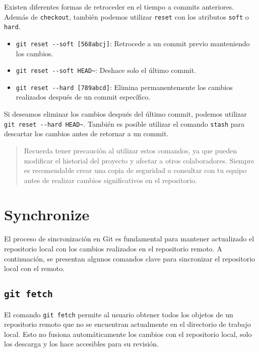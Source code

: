 \documentclass[
  a4paper,
]{article}
\providecommand{\tightlist}{%
  \setlength{\itemsep}{0pt}\setlength{\parskip}{0pt}}\usepackage{longtable,booktabs,array}
\begin{document}
Existen diferentes formas de retroceder en el tiempo a commits
anteriores. Además de \texttt{checkout}, también podemos utilizar
\texttt{reset} con los atributos \texttt{soft} o \texttt{hard}.

\begin{itemize}
\tightlist
\item
  \texttt{git\ reset\ -\/-soft\ {[}568abcj{]}}: Retrocede a un commit
  previo manteniendo los cambios.
\item
  \texttt{git\ reset\ -\/-soft\ HEAD\textasciitilde{}}: Deshace solo el
  último commit.
\item
  \texttt{git\ reset\ -\/-hard\ {[}789abcd{]}}: Elimina permanentemente
  los cambios realizados después de un commit específico.
\end{itemize}

Si deseamos eliminar los cambios después del último commit, podemos
utilizar \texttt{git\ reset\ -\/-hard\ HEAD\textasciitilde{}}. También
es posible utilizar el comando \texttt{stash} para descartar los cambios
antes de retornar a un commit.

\begin{quote}
Recuerda tener precaución al utilizar estos comandos, ya que pueden
modificar el historial del proyecto y afectar a otros colaboradores.
Siempre es recomendable crear una copia de seguridad o consultar con tu
equipo antes de realizar cambios significativos en el repositorio.
\end{quote}

\section{Synchronize}\label{synchronize}

El proceso de sincronización en Git es fundamental para mantener
actualizado el repositorio local con los cambios realizados en el
repositorio remoto. A continuación, se presentan algunos comandos clave
para sincronizar el repositorio local con el remoto.

\subsection{\texorpdfstring{\texttt{git\ fetch}}{git fetch}}\label{git-fetch}

El comando \texttt{git\ fetch} permite al usuario obtener todos los
objetos de un repositorio remoto que no se encuentran actualmente en el
directorio de trabajo local. Esto no fusiona automáticamente los cambios
con el repositorio local, solo los descarga y los hace accesibles para
su revisión.
\end{document}

